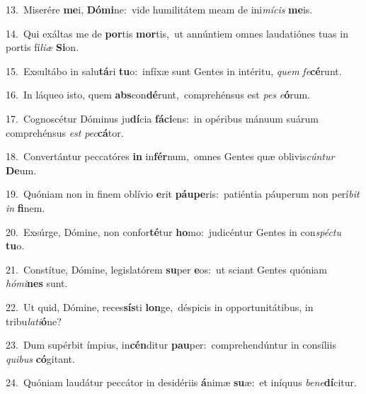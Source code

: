 {\numbfont\textcolor{\numbcolor}{13.}}~Miserére \textbf{me}\-i, \textbf{Dó}\-\textbf{mi}ne:~\star vide humilitátem meam de ini\-\textit{mí}\-\textit{cis} \textbf{me}\-is.\par
{\numbfont\textcolor{\numbcolor}{14.}}~Qui exáltas me de \textbf{por}\-tis \textbf{mor}\-tis,~\star ut annúntiem omnes laudatiónes tuas in portis fí\-\textit{li}\-\textit{æ} \textbf{Si}\-on.\par
{\numbfont\textcolor{\numbcolor}{15.}}~Exsultábo in salu\-\textbf{tá}\-ri \textbf{tu}\-o:~\star infíxæ sunt Gentes in intéritu, \textit{quem} \textit{fe}\-\textbf{cé}runt.\par
{\numbfont\textcolor{\numbcolor}{16.}}~In láqueo isto, quem \textbf{abs}\-con\-\textbf{dé}\-runt,~\star comprehénsus est \textit{pes} \textit{e}\-\textbf{ó}rum.\par
{\numbfont\textcolor{\numbcolor}{17.}}~Cognoscétur Dóminus ju\-\textbf{dí}\-cia \textbf{fá}\-\textbf{ci}ens:~\star in opéribus mánuum suárum comprehénsus \textit{est} \textit{pec}\-\textbf{cá}tor.\par
{\numbfont\textcolor{\numbcolor}{18.}}~Convertántur peccatóres \textbf{in} in\-\textbf{fér}\-num,~\star omnes Gentes quæ oblivis\-\textit{cún}\-\textit{tur} \textbf{De}\-um.\par
{\numbfont\textcolor{\numbcolor}{19.}}~Quóniam non in finem oblívio \textbf{e}\-rit \textbf{páu}\-\textbf{pe}ris:~\star patiéntia páuperum non perí\textit{bit} \textit{in} \textbf{fi}\-nem.\par
{\numbfont\textcolor{\numbcolor}{20.}}~Exsúrge, Dómine, non confor\-\textbf{té}\-tur \textbf{ho}\-mo:~\star judicéntur Gentes in con\-\textit{spéc}\-\textit{tu} \textbf{tu}\-o.\par
{\numbfont\textcolor{\numbcolor}{21.}}~Constítue, Dómine, legislatórem \textbf{su}\-per \textbf{e}\-os:~\star ut sciant Gentes quóniam \textit{hó}\-\textit{mi}\textbf{nes} sunt.\par
{\numbfont\textcolor{\numbcolor}{22.}}~Ut quid, Dómine, reces\-\textbf{sís}\-ti \textbf{lon}\-ge,~\star déspicis in opportunitátibus, in tribu\-\textit{la}\-\textit{ti}\textbf{ó}ne?\par
{\numbfont\textcolor{\numbcolor}{23.}}~Dum supérbit ímpius, in\-\textbf{cén}\-ditur \textbf{pau}\-per:~\star comprehendúntur in consíliis \textit{qui}\-\textit{bus} \textbf{có}\-gitant.\par
{\numbfont\textcolor{\numbcolor}{24.}}~Quóniam laudátur peccátor in desidériis \textbf{á}\-nimæ \textbf{su}\-æ:~\star et iníquus \textit{be}\-\textit{ne}\textbf{dí}citur.\par
